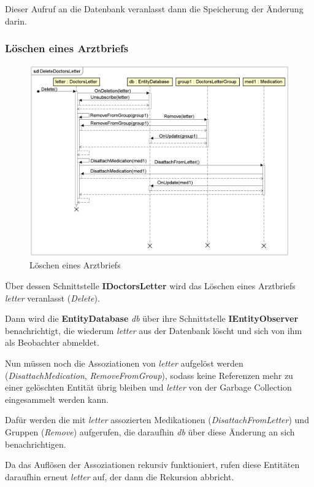 \documentclass[a4paper]{scrreprt}
\begin{document}
Dieser Aufruf an die Datenbank veranlasst dann die Speicherung der Änderung darin.

\subsubsection{Löschen eines Arztbriefs}
\begin{figure}[H]
\centering
\includegraphics[width=0.75\textheight]{graphics/Klassendiagramme/Model/DeleteDoctorsLetter.png}
\caption{Löschen eines Arztbriefs}
\end{figure}
Über dessen Schnittstelle \textbf{IDoctorsLetter} wird das Löschen eines Arztbriefs \textit{letter} veranlasst (\textit{Delete}).

Dann wird die \textbf{EntityDatabase} \textit{db} über ihre Schnittstelle \textbf{IEntityObserver} benachrichtigt, die wiederum \textit{letter} aus der Datenbank löscht und sich von ihm als Beobachter abmeldet.

Nun müssen noch die Assoziationen von \textit{letter} aufgelöst werden (\textit{DisattachMedication}, \textit{RemoveFromGroup}), sodass keine Referenzen mehr zu einer gelöschten Entität übrig bleiben und \textit{letter} von der Garbage Collection eingesammelt werden kann.

Dafür werden die mit \textit{letter} assozierten Medikationen (\textit{DisattachFromLetter}) und Gruppen (\textit{Remove}) aufgerufen, die daraufhin \textit{db} über diese Änderung an sich benachrichtigen.

Da das Auflösen der Assoziationen rekursiv funktioniert, rufen diese Entitäten daraufhin erneut \textit{letter} auf, der dann die Rekursion abbricht.
\end{document}

